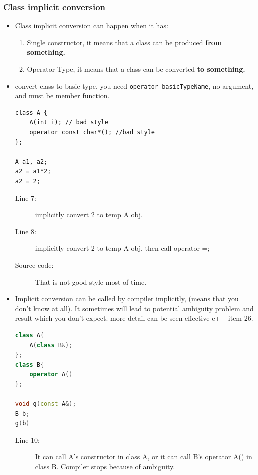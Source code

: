 \documentclass[a4paper,11pt,twoside]{book}
\begin{document}
\subsubsection{Class implicit conversion}
\begin{itemize}
	
	\item Class implicit conversion can happen when it has:
	\begin{enumerate}
		\item Single constructor, it means that a class can be produced \textbf{from something.}
		\item Operator Type, it means that a class can be converted \textbf{to something.}
	\end{enumerate}
	
	\item  convert class to basic type, you need \texttt{operator basicTypeName}, no argument, and must be member function.

\begin{lstlisting}
class A {
	A(int i); // bad style
	operator const char*(); //bad style
};
	
A a1, a2;
a2 = a1*2;  
a2 = 2;
\end{lstlisting}
\begin{description}
	\item[Line 7:] implicitly convert 2 to temp A obj.
	\item[Line 8:] implicitly convert 2 to temp A obj, then call operator =;
	\item[Source code:] That is not good style most of time.
\end{description}
	
	\item Implicit conversion can be called by compiler implicitly, (means that you don't know at all). It sometimes will lead to potential ambiguity problem and result which you don't expect. more detail can be seen effective c++ item 26.
\begin{lstlisting}[frame=single, language=c++]
class A{
	A(class B&);
};
class B{
	operator A()
};
	
void g(const A&);
B b;
g(b)
\end{lstlisting}
\begin{description}
	\item[Line 10:]	It can call A's constructor in class A, or it can call B's operator A() in class B. Compiler stops because of ambiguity.
\end{description}	
	

\end{itemize}
\end{document}
